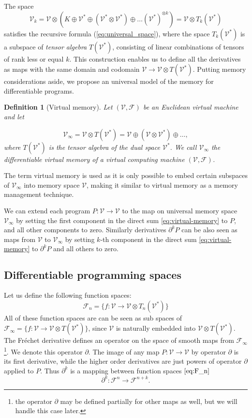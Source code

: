 \documentclass[smallcondensed]{svjour3}
\newcommand{\VV}{\mathcal{V}}
\newcommand{\F}{\mathcal{F}}
\newcommand{\D}{\partial}
\newtheorem{definicija}{Definition}[section]
\begin{document}
  The space
  \begin{equation}
    \label{eq:k-th-virtual-space}
    \VV_k = \VV\otimes \left(K\oplus \VV^* \oplus (\VV^*\otimes \VV^*)\oplus\ldots
      (\VV^*)^{\otimes k}\right) = \VV\otimes T_k(\VV^*)
  \end{equation}
  satisfies the recursive formula (\ref{eq:universal_space}), where the space
  $T_k(\VV^*)$ is a subspace of \emph{tensor algebra} $T(\VV^*)$, consisting of
  linear combinations of tensors of rank less or equal $k$. This construction
  enables us to define all the derivatives as maps with 
  the same domain and codomain $\VV\to \VV\otimes T(\VV^*)$.
  Putting memory considerations aside, we propose an universal model of the
  memory for differentiable programs.
\begin{definicija}[Virtual memory]\label{def:VV}
Let $(\VV,\F)$ be an Euclidean virtual machine and let  

\begin{equation}
\VV_\infty = \VV\otimes T(\VV^*) = \VV\oplus
(\VV\otimes\VV^*)\oplus\ldots,\label{eq:virtual-memory}
\end{equation}
where $T(\VV^*)$ is the tensor algebra of the dual space $\VV^*$.
We call $\VV_\infty$ the \emph{differentiable virtual memory} of a virtual
computing machine $(\VV,\F)$.
\end{definicija}
The term virtual memory is used as it is only possible to embed certain subspaces of $\VV_\infty$ into memory space $\VV$, making it similar to
virtual memory as a memory management technique.  

We can extend each program $P:\VV\to \VV$ to the map on
universal memory space $\VV_\infty$ by setting the first component in the direct sum
\eqref{eq:virtual-memory} to $P$, and all other components to zero. Similarly
derivatives $\D^k P$ can be also seen as maps  from $\VV$ to $\VV_\infty$ by
setting $k$-th component in the direct sum \eqref{eq:virtual-memory} to $\D^k P$
and all others to zero. 
\subsection{Differentiable programming spaces}

Let us define the following function spaces:
 \begin{equation}\label{eq:F_n}
 	\F_n=\{f:\VV\to \VV\otimes T_n(\VV^*)\}
 \end{equation}
All of these function spaces are can be seen as sub spaces of $\F_\infty=\{f:\VV\to \VV\otimes
T(\VV^*)\}$, since $\VV$ is naturally embedded into $ \VV\otimes T(\VV^*)$. The
Fréchet derivative defines an operator on the space of smooth maps from $\F_\infty$\footnote{the operator $\D$ may be defined partially for other maps as
   well, but we will handle this case later.}. We denote this operator $\D$. The image of any map
 $P:\VV\to \VV$ by operator $\D$ is its first derivative, while the higher order
 derivatives are just powers of operator $\D$ applied to $P$.
 Thus $\D^k$ is a mapping between function spaces $\eqref{eq:F_n}$
 \begin{equation}\label{eq:toFn+k}
 \D^k:\F^n\to\F^{n+k}.
 \end{equation}
 
\end{document}
